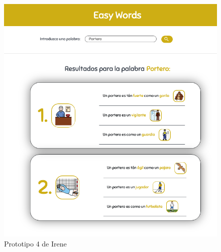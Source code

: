 \begin{figure}[!t]
	\includegraphics[width=.8\textwidth]{Imagenes/Bitmap/Mockups/mockup4_irene_inicial.png}
	\centering
	\caption{Prototipo 4 de Irene}
	\label{fig:mockup4irene_vInicial}
\end{figure}

